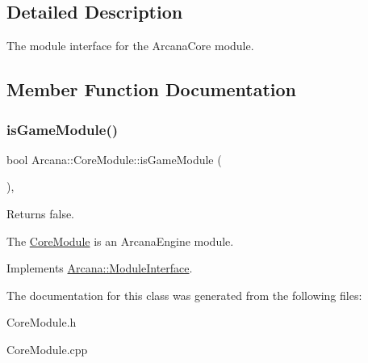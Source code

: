 \subsection{Detailed Description}
The module interface for the Arcana\+Core module. 

\subsection{Member Function Documentation}
\mbox{\label{class_arcana_1_1_core_module_a0b16024de66b0b0f50bac83f20d50c74}} 
\subsubsection{\texorpdfstring{is\+Game\+Module()}{isGameModule()}}
{\footnotesize\ttfamily bool Arcana\+::\+Core\+Module\+::is\+Game\+Module (\begin{DoxyParamCaption}{ }\end{DoxyParamCaption})\hspace{0.3cm}{\ttfamily [override]}, {\ttfamily [virtual]}}



Returns false. 

The \mbox{\hyperlink{class_arcana_1_1_core_module}{Core\+Module}} is an Arcana\+Engine module. 

Implements \mbox{\hyperlink{class_arcana_1_1_module_interface_a2836a901809149b08e25a36a8e939a44}{Arcana\+::\+Module\+Interface}}.



The documentation for this class was generated from the following files\+:\begin{DoxyCompactItemize}
\item 
Core\+Module.\+h\item 
Core\+Module.\+cpp\end{DoxyCompactItemize}
